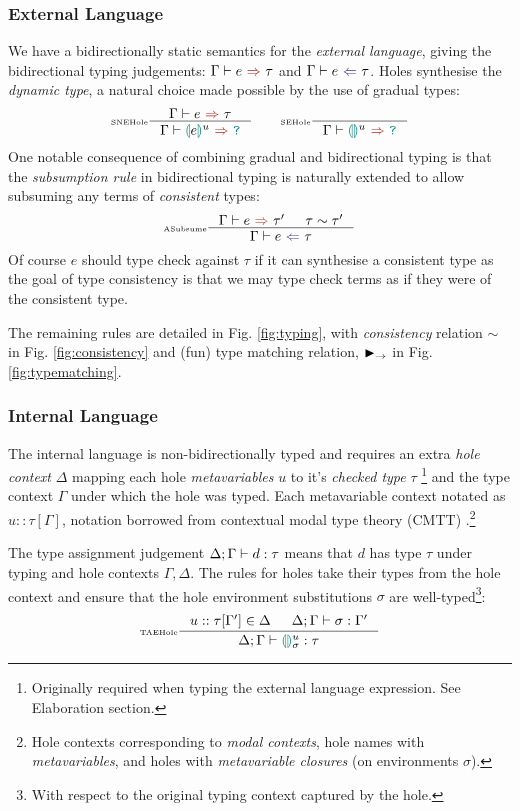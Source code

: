 \subsubsection{External Language}\label{sec:HazelExternalLang}
We have a bidirectionally static semantics for the \textit{external language}, giving the bidirectional typing judgements: $\synthesis{e}{\tau}$ and $\analysis{e}{\tau}$. Holes synthesise the \textit{dynamic type}, a natural choice made possible by the use of gradual types:
\[\inference[\tiny SNEHole]{\synthesis{e}{\tau}}{\synthesis{\hole[e]^u}{\dyn}} \qquad \inference[\tiny SEHole]{}{\synthesis{\hole^u}{\dyn}}\] 
One notable consequence of combining gradual and bidirectional typing is that the \textit{subsumption rule} in bidirectional typing is naturally extended to allow subsuming any terms of \textit{consistent} types:
\[\inference[\tiny ASubsume]{\synthesis{e}{\tau'}& \tau \sim \tau'}{\analysis{e}{\tau}}\]
Of course $e$ should type check against $\tau$ if it can synthesise a consistent type as the goal of type consistency is that we may type check terms as if they were of the consistent type.

The remaining rules are detailed in Fig. \ref{fig:typing}, with \textit{consistency} relation $\sim$ in Fig. \ref{fig:consistency} and (fun) type matching relation, $\blacktriangleright_\rightarrow$ in Fig. \ref{fig:typematching}. 
\subsubsection{Internal Language}\label{sec:HazelInternalLang}
The internal language is non-bidirectionally typed and requires an extra \textit{hole context} $\Delta$ mapping each hole \textit{metavariables} $u$ to it's \textit{checked type} $\tau$ \footnote{Originally required when typing the external language expression. See Elaboration section.} and the type context $\Gamma$ under which the hole was typed. Each metavariable context notated as $u :: \tau[\Gamma]$, notation borrowed from contextual modal type theory (CMTT) \cite{CMTT}.\footnote{Hole contexts corresponding to \textit{modal contexts}, hole names with \textit{metavariables}, and holes with \textit{metavariable closures} (on environments $\sigma$).} 

The type assignment judgement $\Delta;\Gamma \vdash d : \tau$ means that $d$ has type $\tau$ under typing and hole contexts $\Gamma, \Delta$. The rules for holes take their types from the hole context and ensure that the hole environment substitutions $\sigma$ are well-typed\footnote{With respect to the original typing context captured by the hole.}:
\[\inference[\tiny TAEHole]{u :: \tau[\Gamma'] \in \Delta & \typeassignment{\sigma}{\Gamma'}}{\typeassignment{\hole^u_\sigma}{\tau}}\]

